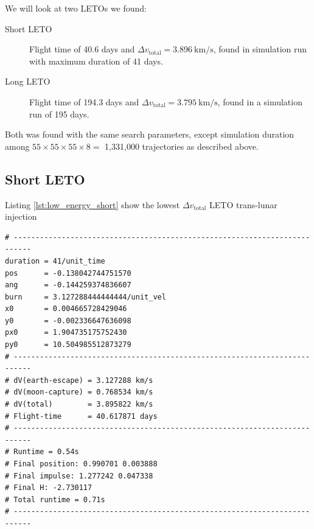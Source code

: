 We will look at two LETOs we found:
\begin{description}
    \item[Short LETO] Flight time of 40.6 days and $\Delta v_{\text{total}} = \SI{3.896}{\km\per\s}$, found in simulation run with maximum duration of 41 days.
    \item[Long LETO] Flight time of 194.3 days and $\Delta v_{\text{total}} = \SI{3.795}{\km\per\s}$, found in a simulation run of 195 days.
\end{description}
Both was found with the same search parameters, except simulation duration among $55 \times 55 \times 55 \times 8 =$ 1,331,000 trajectories as described above.


\subsection{Short LETO}
Listing \ref{lst:low_energy_short} show the lowest $\Delta v_{\text{total}}$ LETO trans-lunar injection 

\begin{adjustwidth*}{0cm}{-0.4cm}
\begin{lstlisting}[caption={Short LETO. \texttt{pos} = angular difference with start angle (here $\theta=-3\pi/4$), \texttt{ang} = angle to velocity vector in Earth parking orbit, \texttt{burn} = $\Delta v_{\text{earth}}$, \texttt{(x0,y0,px0,py0)} are the initial conditions.},label=lst:low_energy_short]
# --------------------------------------------------------------------------
duration = 41/unit_time
pos      = -0.138042744751570
ang      = -0.144259374836607
burn     = 3.127288444444444/unit_vel
x0       = 0.004665728429046
y0       = -0.002336647636098
px0      = 1.904735175752430
py0      = 10.504985512873279
# --------------------------------------------------------------------------
# dV(earth-escape) = 3.127288 km/s
# dV(moon-capture) = 0.768534 km/s
# dV(total)        = 3.895822 km/s
# Flight-time      = 40.617871 days
# --------------------------------------------------------------------------
# Runtime = 0.54s
# Final position: 0.990701 0.003888
# Final impulse: 1.277242 0.047338
# Final H: -2.730117
# Total runtime = 0.71s
# --------------------------------------------------------------------------
\end{lstlisting}
\end{adjustwidth*}

